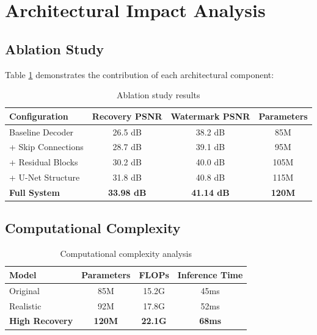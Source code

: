 \documentclass[12pt,a4paper]{report}
\begin{document}
\section{Architectural Impact Analysis}

\subsection{Ablation Study}

Table \ref{tab:ablation_study} demonstrates the contribution of each architectural component:

\begin{table}[H]
    \centering
    \caption{Ablation study results}
    \label{tab:ablation_study}
    \begin{tabular}{@{}lccc@{}}
        \toprule
        Configuration & Recovery PSNR & Watermark PSNR & Parameters \\
        \midrule
        Baseline Decoder & 26.5 dB & 38.2 dB & 85M \\
        + Skip Connections & 28.7 dB & 39.1 dB & 95M \\
        + Residual Blocks & 30.2 dB & 40.0 dB & 105M \\
        + U-Net Structure & 31.8 dB & 40.8 dB & 115M \\
        \textbf{Full System} & \textbf{33.98 dB} & \textbf{41.14 dB} & \textbf{120M} \\
        \bottomrule
    \end{tabular}
\end{table}

\subsection{Computational Complexity}

\begin{table}[H]
    \centering
    \caption{Computational complexity analysis}
    \label{tab:complexity}
    \begin{tabular}{@{}lccc@{}}
        \toprule
        Model & Parameters & FLOPs & Inference Time \\
        \midrule
        Original & 85M & 15.2G & 45ms \\
        Realistic & 92M & 17.8G & 52ms \\
        \textbf{High Recovery} & \textbf{120M} & \textbf{22.1G} & \textbf{68ms} \\
        \bottomrule
    \end{tabular}
\end{table}
\end{document}
